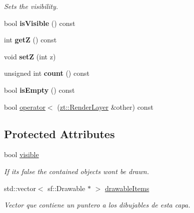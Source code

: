 \begin{DoxyCompactItemize}
\begin{DoxyCompactList}\small\item\em Sets the visibility. \end{DoxyCompactList}\item 
\mbox{\label{classzt_1_1_render_layer_a8c7c33d51d373350a5973a55584b394d}} 
bool {\bfseries is\+Visible} () const
\item 
\mbox{\label{classzt_1_1_render_layer_a4a875d392ad3e03acb653f295005909f}} 
int {\bfseries getZ} () const
\item 
\mbox{\label{classzt_1_1_render_layer_a112e8fea237b99ab0075a48cc2963b96}} 
void {\bfseries setZ} (int z)
\item 
\mbox{\label{classzt_1_1_render_layer_a77dc63ee7dc9f16a1d0c2a35beea98f9}} 
unsigned int {\bfseries count} () const
\item 
\mbox{\label{classzt_1_1_render_layer_ad0bbedf8a92173823d16bb7aebedccc6}} 
bool {\bfseries is\+Empty} () const
\item 
bool \hyperlink{classzt_1_1_render_layer_a7eb4504147aee10b610602c8363311ca}{operator$<$} (\hyperlink{classzt_1_1_render_layer}{zt\+::\+Render\+Layer} \&other) const
\end{DoxyCompactItemize}
\subsection*{Protected Attributes}
\begin{DoxyCompactItemize}
\item 
\mbox{\label{classzt_1_1_render_layer_a5a6dc2d742807bad7533992512d060b4}} 
bool \hyperlink{classzt_1_1_render_layer_a5a6dc2d742807bad7533992512d060b4}{visible}
\begin{DoxyCompactList}\small\item\em If it\textquotesingle{}s false the contained objects won\textquotesingle{}t be drawn. \end{DoxyCompactList}\item 
\mbox{\label{classzt_1_1_render_layer_ac19c3e70a9a3329d46b8a16e91aa17e9}} 
std\+::vector$<$ sf\+::\+Drawable $\ast$ $>$ \hyperlink{classzt_1_1_render_layer_ac19c3e70a9a3329d46b8a16e91aa17e9}{drawable\+Items}
\begin{DoxyCompactList}\small\item\em Vector que contiene un puntero a los dibujables de esta capa. \end{DoxyCompactList}\end{DoxyCompactItemize}


